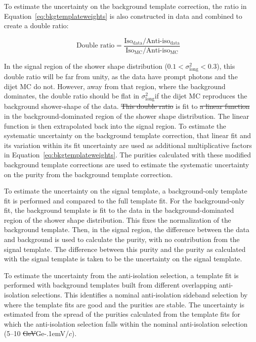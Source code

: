 \documentclass[ALICE,manyauthors]{cernphprep}
\newcommand{\lambdasquare}{\ensuremath{\sigma^{2}_{\mathrm{long}}}}
\newcommand{\GeVc}         {Ge\kern-.1emV/$c$\xspace}
\providecommand{\DIFaddtex}[1]{{\protect\color{blue}\uwave{#1}}} %
\providecommand{\DIFdeltex}[1]{{\protect\color{red}\sout{#1}}}                      %
\providecommand{\DIFaddbegin}{} %
\providecommand{\DIFaddend}{} %
\providecommand{\DIFdelbegin}{} %
\providecommand{\DIFdelend}{} %
\providecommand{\DIFadd}[1]{\texorpdfstring{\DIFaddtex{#1}}{#1}} %
\providecommand{\DIFdel}[1]{\texorpdfstring{\DIFdeltex{#1}}{}} %
\newcommand{\DIFscaledelfig}{0.5}
\newlength{\DIFdelgraphicswidth} %
\newlength{\DIFdelgraphicsheight} %
\newcommand{\DIFaddincludegraphics}[2][]{{\color{blue}\fbox{\DIFOincludegraphics[#1]{#2}}}} %
\newcommand{\DIFdelincludegraphics}[2][]{%
\sbox{\DIFdelgraphicsbox}{\DIFOincludegraphics[#1]{#2}}%
\settoboxwidth{\DIFdelgraphicswidth}{\DIFdelgraphicsbox} %
\settoboxtotalheight{\DIFdelgraphicsheight}{\DIFdelgraphicsbox} %
\scalebox{\DIFscaledelfig}{%
\parbox[b]{\DIFdelgraphicswidth}{\usebox{\DIFdelgraphicsbox}\\[-\baselineskip] \rule{\DIFdelgraphicswidth}{0em}}\llap{\resizebox{\DIFdelgraphicswidth}{\DIFdelgraphicsheight}{%
\setlength{\unitlength}{\DIFdelgraphicswidth}%
\begin{picture}(1,1)%
\thicklines\linethickness{2pt} %
{\color[rgb]{1,0,0}\put(0,0){\framebox(1,1){}}}%
{\color[rgb]{1,0,0}\put(0,0){\line( 1,1){1}}}%
{\color[rgb]{1,0,0}\put(0,1){\line(1,-1){1}}}%
\end{picture}%
}\hspace*{3pt}}} %
} %
\DeclareRobustCommand{\DIFaddbegin}{\DIFOaddbegin \let\includegraphics\DIFaddincludegraphics} %
\DeclareRobustCommand{\DIFaddend}{\DIFOaddend \let\includegraphics\DIFOincludegraphics} %
\DeclareRobustCommand{\DIFdelbegin}{\DIFOdelbegin \let\includegraphics\DIFdelincludegraphics} %
\DeclareRobustCommand{\DIFdelend}{\DIFOaddend \let\includegraphics\DIFOincludegraphics} %
\begin{document}
To estimate the uncertainty on the background template correction, the ratio in Equation~\ref{eq:bkgtemplateweights} is also constructed in data and combined to create a double ratio:

\begin{equation}
    \text{Double ratio} = \frac{\text{Iso}_{\text{data}}/\text{Anti-iso}_{\text{data}}}{\text{Iso}_{\text{MC}}/\text{Anti-iso}_{\text{MC}}}
    \label{eq:bkgtemplatedoubleratio}
\end{equation}

In the signal region of the shower shape distribution ($0.1<\lambdasquare<0.3$), this double ratio will be far from unity, as the data have prompt photons and the dijet MC do not. However, away from that region, where the background dominates, the double ratio should be flat in \lambdasquare\DIFaddbegin \DIFadd{~}\DIFaddend if the dijet MC reproduces the background shower-shape of the data. \DIFdelbegin \DIFdel{This double ratio }\DIFdelend \DIFaddbegin \DIFadd{A linear function }\DIFaddend is fit to \DIFdelbegin \DIFdel{a linear function }\DIFdelend \DIFaddbegin \DIFadd{this double ratio }\DIFaddend in the background-dominated region of the shower shape distribution. The linear function is then extrapolated back into the signal region. To estimate the systematic uncertainty on the background template correction, that linear fit and its variation within its fit uncertainty are used as additional multiplicative factors in Equation~\ref{eq:bkgtemplateweights}. The purities calculated with these modified background template corrections are used to estimate the systematic uncertainty on the purity from the background template correction.

To estimate the uncertainty on the signal template, a background-only template fit is performed and compared to the full template fit. For the background-only fit, the background template is fit to the data in the background-dominated region of the shower shape distribution. This fixes the normalization of the background template. Then,  in the signal region, the difference between the data and background is used to calculate the purity, with no contribution from the signal template. The difference between this purity and the purity as calculated with the signal template is taken to be the uncertainty on the signal template.

To estimate the uncertainty from the anti-isolation selection, a template fit is performed with background templates built from different overlapping anti-isolation selections. This identifies a nominal anti-isolation sideband selection by where the template fits are good and the purities are stable. The uncertainty is estimated from the spread of the purities calculated from the template fits for which the anti-isolation selection falls within the nominal anti-isolation selection (5--10 \DIFdelbegin \DIFdel{GeV}\DIFdelend \DIFaddbegin \GeVc\DIFaddend ). 
\end{document}
